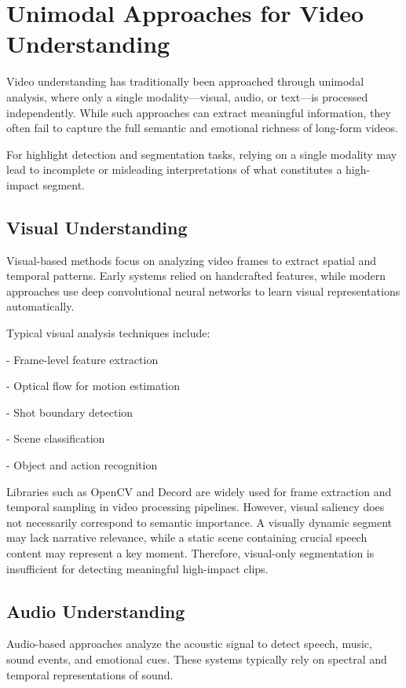 \documentclass[12pt,a4paper,oneside,english]{book}
\begin{document}
\section{Unimodal Approaches for Video Understanding}%
\label{sec:unimodal_approach}
Video understanding has traditionally been approached through unimodal analysis, where only a single modality—visual, audio, or text—is processed independently. While such approaches can extract meaningful information, they often fail to capture the full semantic and emotional richness of long-form videos.

For highlight detection and segmentation tasks, relying on a single modality may lead to incomplete or misleading interpretations of what constitutes a high-impact segment.
\subsection{Visual Understanding}
\label{subsec:visual}
Visual-based methods focus on analyzing video frames to extract spatial and temporal patterns. Early systems relied on handcrafted features, while modern approaches use deep convolutional neural networks to learn visual representations automatically.

Typical visual analysis techniques include:

- Frame-level feature extraction

- Optical flow for motion estimation

- Shot boundary detection

- Scene classification

- Object and action recognition

Libraries such as OpenCV and Decord are widely used for frame extraction and temporal sampling in video processing pipelines.
However, visual saliency does not necessarily correspond to semantic importance. A visually dynamic segment may lack narrative relevance, while a static scene containing crucial speech content may represent a key moment. Therefore, visual-only segmentation is insufficient for detecting meaningful high-impact clips.

\subsection{Audio Understanding}
\label{subsec:audio}
Audio-based approaches analyze the acoustic signal to detect speech, music, sound events, and emotional cues. These systems typically rely on spectral and temporal representations of sound.
\end{document}
